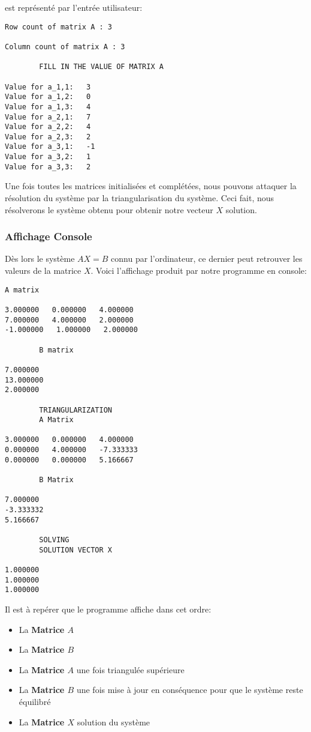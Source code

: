 est représenté par l'entrée utilisateur:
\begin{lstlisting}[caption=User Input, basicstyle=\fontsize{6}{8}\selectfont]
Row count of matrix A : 3

Column count of matrix A : 3

		FILL IN THE VALUE OF MATRIX A 

Value for a_1,1:   3
Value for a_1,2:   0
Value for a_1,3:   4
Value for a_2,1:   7
Value for a_2,2:   4
Value for a_2,3:   2
Value for a_3,1:   -1
Value for a_3,2:   1
Value for a_3,3:   2

\end{lstlisting}
Une fois toutes les matrices initialisées et complétées, nous pouvons attaquer la résolution du système par la triangularisation du système. Ceci fait, nous résolverons le système obtenu pour obtenir notre vecteur $X$ solution.\\
\subsubsection{Affichage Console}
Dès lors le système $AX=B$ connu par l'ordinateur, ce dernier peut retrouver les valeurs de la matrice $X$. Voici l'affichage produit par notre programme en console: \\
\begin{lstlisting}[caption=Console Display of the Gauss elimination for the AX=B system mentioned above, basicstyle=\fontsize{6}{8}\selectfont]
		A matrix 

3.000000   0.000000   4.000000   
7.000000   4.000000   2.000000   
-1.000000   1.000000   2.000000   

		B matrix 

7.000000   
13.000000   
2.000000   

		TRIANGULARIZATION 
		A Matrix 

3.000000   0.000000   4.000000   
0.000000   4.000000   -7.333333   
0.000000   0.000000   5.166667   

		B Matrix 

7.000000   
-3.333332   
5.166667   

		SOLVING 
		SOLUTION VECTOR X 

1.000000   
1.000000   
1.000000   

\end{lstlisting}
Il est à repérer que le programme affiche dans cet ordre: \\
\begin{itemize}
\item La \textbf{Matrice $A$}
\item La \textbf{Matrice $B$}
\item La \textbf{Matrice $A$} une fois triangulée supérieure
\item La \textbf{Matrice $B$} une fois mise à jour en conséquence pour que le système reste équilibré
\item La \textbf{Matrice $X$} solution du système
\end{itemize}

